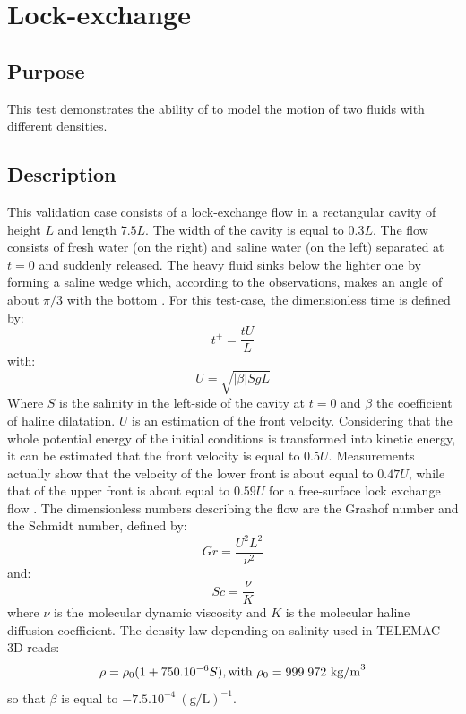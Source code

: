 \chapter{Lock-exchange}
%
%
\section{Purpose}
%
This test demonstrates the ability of  to model the motion
of two fluids with different densities.
%
\section{Description}
%
This validation case consists of a lock-exchange flow in a rectangular cavity of height
$L$ and length $7.5L$. The width of the cavity is equal to $0.3L$.
The flow consists of fresh water (on the right) and saline water (on the left)
separated at $t=0$ and suddenly released.
The heavy fluid sinks below the lighter one by forming a saline wedge which,
according to the observations, makes an angle of about $\pi/3$ with the bottom \cite{Benjamin1968}.
For this test-case, the dimensionless time is defined by:
\begin{equation}
t^+= \frac{t U}{L}
\end{equation}
with:
\begin{equation}
U = \sqrt{|\beta| S gL}
\end{equation}
Where $S$ is the salinity in the left-side of the cavity at $t=0$ and
$\beta$ the coefficient of haline dilatation.
$U$ is an estimation of the front velocity. Considering that the whole potential energy of the initial conditions is
transformed into kinetic energy, it can be estimated that the front velocity is equal to 0.5$U$.
Measurements actually show that the velocity of the lower front is about equal to $0.47U$,
while that of the upper front is about equal to $0.59U$ for a free-surface lock exchange flow \cite{Barr1967}.
The dimensionless numbers describing the flow are the Grashof number
and the Schmidt number, defined by:
\begin{equation}\label{eq:Grashof}
  Gr = \dfrac{U^2 L^2}{\nu^2}
\end{equation}
and:
\begin{equation}\label{eq:Schmidt}
  Sc =  \dfrac{\nu}{K}
\end{equation}
where $\nu$ is the molecular dynamic viscosity and $K$ is the molecular
haline diffusion coefficient. The density law depending on salinity used in TELEMAC-3D reads:
\begin{equation}
\rho = \rho_{0} (1 + 750.10^{-6} S ),
\rm{with }~ \rho_{0} = 999.972~\rm{kg/m}^3
\end{equation}
so that $\beta$ is equal to $-7.5.10^{-4}~(\text{g/L})^{-1}$.

